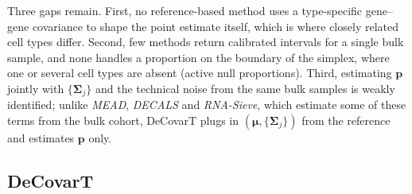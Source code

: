 \documentclass[pdflatex, sn-nature]{sn-jnl}
\theoremstyle{thmstyleone}%
\theoremstyle{thmstyletwo}%
\theoremstyle{thmstylethree}%
\begin{document}
Three gaps remain.
First, no reference-based method uses a type-specific gene--gene covariance to shape the
point estimate itself, which is where closely related cell types differ.
Second, few methods return calibrated intervals for a single bulk sample, and none handles a
proportion on the boundary of the \gls{simplex}, where one or several cell types are absent
(active null proportions).
Third, estimating \(\boldsymbol{p}\) jointly with \(\{\boldsymbol{\Sigma}_{j}\}\) and the technical noise from the
same bulk samples is weakly identified; unlike \emph{MEAD}, \emph{DECALS} and \emph{RNA-Sieve}, which
estimate some of these terms from the bulk cohort, DeCovarT plugs in
\((\boldsymbol{\mu},\{\boldsymbol{\Sigma}_{j}\})\) from the reference and estimates \(\boldsymbol{p}\) only.

\subsection{DeCovarT}
\label{sec:decovart}
\end{document}
